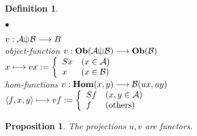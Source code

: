 \documentclass[12pt]{article}
\theoremstyle{plain}
\newtheorem{proposition}[theorem]{Proposition}
\newtheorem{definition}[theorem]{Definition}
\theoremstyle{definition}
\begin{document}
\begin{definition}
\begin{list}{$\bullet$}{}
\item $v:{\cal A}\sqcup \hspace{-.76em} \mid {\cal B} \longrightarrow B$ \\
 object-function $v:{\bf Ob}{\rm (}{\cal A}\sqcup \hspace{-.76em} \mid {\cal B}{\rm )} \longrightarrow {\bf Ob}{\rm (}{\cal B}{\rm )}$ \\
\hspace{141pt} $x \longmapsto vx := \left\{ \begin{array}{ll}
Sx & {\rm (}x \in {\cal A}{\rm )} \\
x & {\rm (}x \in {\cal B}{\rm )} \\
\end{array} \right. $ \\
 hom-functions $v:{\bf Hom}{\rm (}x,y{\rm )} \longrightarrow {\cal B}{\rm (}ux,uy{\rm )}$　\\
\hspace{106pt} $\langle f,x,y \rangle \longmapsto vf := \left\{ \begin{array}{ll}
Sf & {\rm (}x,y \in {\cal A}{\rm )} \\
f & {\rm ( others )} \\ 
\end{array} \right.$ 
\end{list}
\end{definition}

\begin{proposition}
The projections $u,v$ are functors.
\end{proposition}
\end{document}
